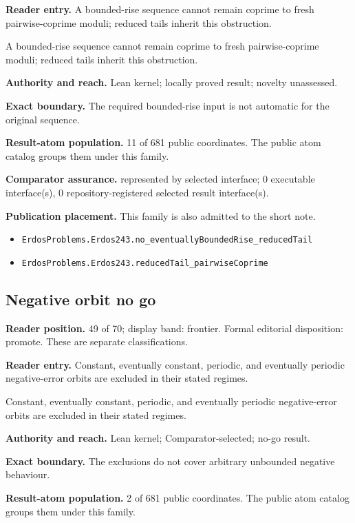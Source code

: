 \documentclass[11pt]{article}
\begin{document}
\textbf{Reader entry.} A bounded-rise sequence cannot remain coprime to fresh pairwise-coprime moduli; reduced tails inherit this obstruction.

A bounded-rise sequence cannot remain coprime to fresh pairwise-coprime moduli; reduced tails inherit this obstruction.

\textbf{Authority and reach.} Lean kernel; locally proved result; novelty unassessed.

\textbf{Exact boundary.} The required bounded-rise input is not automatic for the original sequence.

\textbf{Result-atom population.} 11 of 681 public coordinates. The public atom catalog groups them under this family.

\textbf{Comparator assurance.} represented by selected interface; 0 executable interface(s), 0 repository-registered selected result interface(s).

\textbf{Publication placement.} This family is also admitted to the short note.

\begin{itemize}
  \item \nolinkurl{ErdosProblems.Erdos243.no_eventuallyBoundedRise_reducedTail}
  \item \nolinkurl{ErdosProblems.Erdos243.reducedTail_pairwiseCoprime}
\end{itemize}

\subsection{Negative orbit no go}
\textbf{Reader position.} 49 of 70; display band: frontier.  Formal editorial disposition: promote.  These are separate classifications.

\textbf{Reader entry.} Constant, eventually constant, periodic, and eventually periodic negative-error orbits are excluded in their stated regimes.

Constant, eventually constant, periodic, and eventually periodic negative-error orbits are excluded in their stated regimes.

\textbf{Authority and reach.} Lean kernel; Comparator-selected; no-go result.

\textbf{Exact boundary.} The exclusions do not cover arbitrary unbounded negative behaviour.

\textbf{Result-atom population.} 2 of 681 public coordinates. The public atom catalog groups them under this family.
\end{document}
